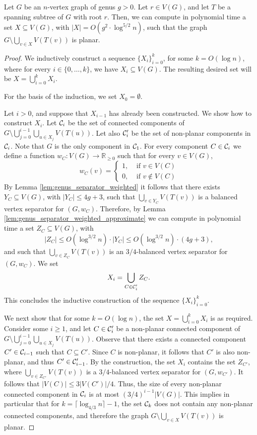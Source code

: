 \documentclass[envcountsect]{llncs}
\begin{document}
\begin{lemma}\label{lem:computing_planarizing_paths}
Let $G$ be an $n$-vertex graph of genus $g>0$.
Let $r\in V(G)$, and let $T$ be a spanning subtree of $G$ with root $r$.
Then, we can compute in polynomial time a set $X\subseteq V(G)$, with $|X| = O(g^{2}\cdot \log^{5/2} n)$, such that the graph $G \setminus \bigcup_{v\in X} V(T(v))$ is planar.
\end{lemma}
\begin{proof}
We inductively construct a sequence $\{X_i\}_{i=0}^k$, for some $k=O(\log n)$, where for every $i\in \{0,\ldots,k\}$, we have $X_i\subseteq V(G)$.
The resulting desired set will be $X=\bigcup_{i=0}^k X_i$.

For the basis of the induction, we set $X_0=\emptyset$.

Let $i>0$, and suppose that $X_{i-1}$ has already been constructed.
We show how to construct $X_i$.
Let ${\cal C}_i$ be the set of connected components of $G\setminus \bigcup_{j=0}^{i-1} \bigcup_{u\in X_j} V(T(u))$.
Let also ${\cal C}_i'$ be the set of non-planar components in ${\cal C}_i$.
Note that $G$ is the only component in ${\cal C}_1$.
For every component $C\in {\cal C}_i$ we define a function $w_C:V(G)\to \mathbb{R}_{\geq 0}$ such that for every $v\in V(G)$,
\[
w_C(v) = \left\{
\begin{array}{ll}
  1, & \mbox{ if } v\in V(C)\\
  0, & \mbox{ if } v\notin V(C)
\end{array}
\right.
\]
By Lemma \ref{lem:genus_separator_weighted} it follows that there exists $Y_C\subseteq V(G)$, with $|Y_C| \leq 4g+3$, such that $\bigcup_{v\in Y_C}V(T(v))$ is a balanced vertex separator for $(G, w_C)$.
Therefore, by Lemma \ref{lem:genus_separator_weighted_approximate} we can compute in polynomial time a set $Z_C\subseteq V(G)$, with 
\[
|Z_C| \leq O(\log^{3/2} n)\cdot |Y_C| \leq O(\log^{3/2} n) \cdot (4g+3),
\]
and such that $\bigcup_{v\in Z_C}V(T(v))$ is an $3/4$-balanced vertex separator for $(G, w_C)$.
We set
\[
X_i = \bigcup_{C\in {\cal C}_i'} Z_C.
\]
This concludes the inductive construction of the sequence $\{X_i\}_{i=0}^k$.

We next show that for some $k=O(\log n)$, the set $X=\bigcup_{i=0}^k X_i$ is as required.
Consider some $i\geq 1$, and let $C\in {\cal C}_i'$ be a non-planar connected component of $G\setminus \bigcup_{j=0}^{i-1} \bigcup_{u\in X_j} V(T(u))$.
Observe that there exists a connected component $C'\in {\cal C}_{i-1}$ such that $C\subseteq C'$.
Since $C$ is non-planar, it follows that $C'$ is also non-planar, and thus $C'\in {\cal C}_{i-1}'$.
By the construction, the set $X_i$ contains the set $Z_{C'}$, where $\bigcup_{v\in Z_{C'}}V(T(v))$ is 
a $3/4$-balanced vertex separator for $(G, w_{C'})$.
It follows that $|V(C)| \leq 3|V(C')|/4$.
Thus, the size of every non-planar connected component in ${\cal C}_i$ is at most $(3/4)^{i-1}|V(G)|$.
This implies in particular that for $k=\lceil \log_{4/3} n\rceil-1$, the set ${\cal C}_k$ does not contain any non-planar connected components, and therefore the graph $G \setminus \bigcup_{v\in X} V(T(v))$ is planar.


\end{proof}
\end{document}
